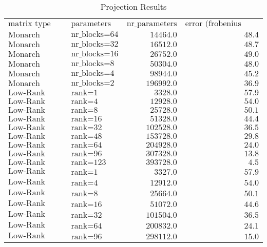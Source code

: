 \centering
\tiny
\begin{longtable}{llrr}
\caption{Projection Results} \label{tab:projection_table_c10} \\
$\text{matrix type}$ & $\text{parameters}$ & $\text{nr\_parameters}$ & $\text{error (frobenius norm)}$\\
$\text{Monarch}$ & $\text{nr\_blocks=64}$ & $14464.0$ & $48.4$\\
$\text{Monarch}$ & $\text{nr\_blocks=32}$ & $16512.0$ & $48.7$\\
$\text{Monarch}$ & $\text{nr\_blocks=16}$ & $26752.0$ & $49.0$\\
$\text{Monarch}$ & $\text{nr\_blocks=8}$ & $50304.0$ & $48.0$\\
$\text{Monarch}$ & $\text{nr\_blocks=4}$ & $98944.0$ & $45.2$\\
$\text{Monarch}$ & $\text{nr\_blocks=2}$ & $196992.0$ & $36.9$\\
$\text{Low-Rank}$ & $\text{rank=1}$ & $3328.0$ & $57.9$\\
$\text{Low-Rank}$ & $\text{rank=4}$ & $12928.0$ & $54.0$\\
$\text{Low-Rank}$ & $\text{rank=8}$ & $25728.0$ & $50.1$\\
$\text{Low-Rank}$ & $\text{rank=16}$ & $51328.0$ & $44.4$\\
$\text{Low-Rank}$ & $\text{rank=32}$ & $102528.0$ & $36.5$\\
$\text{Low-Rank}$ & $\text{rank=48}$ & $153728.0$ & $29.8$\\
$\text{Low-Rank}$ & $\text{rank=64}$ & $204928.0$ & $24.0$\\
$\text{Low-Rank}$ & $\text{rank=96}$ & $307328.0$ & $13.8$\\
$\text{Low-Rank}$ & $\text{rank=123}$ & $393728.0$ & $4.5$\\
$\text{Low-Rank Light}$ & $\text{rank=1}$ & $3327.0$ & $57.9$\\
$\text{Low-Rank Light}$ & $\text{rank=4}$ & $12912.0$ & $54.0$\\
$\text{Low-Rank Light}$ & $\text{rank=8}$ & $25664.0$ & $50.1$\\
$\text{Low-Rank Light}$ & $\text{rank=16}$ & $51072.0$ & $44.6$\\
$\text{Low-Rank Light}$ & $\text{rank=32}$ & $101504.0$ & $36.5$\\
$\text{Low-Rank Light}$ & $\text{rank=64}$ & $200832.0$ & $24.1$\\
$\text{Low-Rank Light}$ & $\text{rank=96}$ & $298112.0$ & $15.0$\\

\end{longtable}
